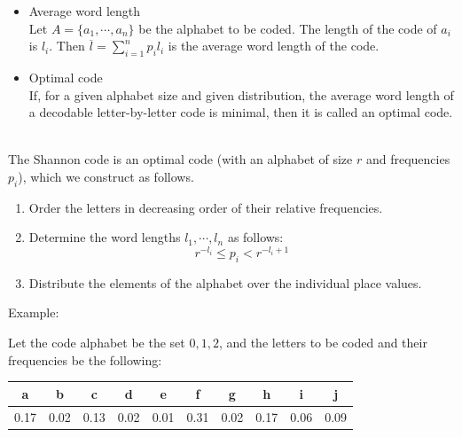 \documentclass[margin=0px]{article}
\begin{document}
\begin{description}
\begin{itemize}
                  \begin{enumerate}
                      \item decodable (uniquely decodable) if $\psi$ is injective
                      \item a prefix code if the range of $\varphi$ is prefix-free.
                      \item a uniform code (fixed length) if every element in the range of $\psi$ has the same length
                      \item a comma code if $\exists \vartheta \in B^+$ comma such that $\vartheta$ is a suffix of every code word, but is neither a prefix nor an infix of any code word.
                  \end{enumerate}
            \item Average word length \\
                  Let $A = \{a_1,\cdots, a_n\}$ be the alphabet to be coded. The length of the code of $a_i$ is $l_i$. Then $\overline{l} = \sum_{i=1}^{n}p_il_i$ is the average word length of the code.
            \item Optimal code \\
                  If, for a given alphabet size and given distribution, the average word length of a decodable letter-by-letter code is minimal, then it is called an optimal code.
        \end{itemize}
    \item[Shannon code] \hfill \\
        The Shannon code is an optimal code (with an alphabet of size $r$ and frequencies $p_i$), which we construct as follows.
        \begin{enumerate}
            \item Order the letters in decreasing order of their relative frequencies.
            \item Determine the word lengths $l_1,\cdots,l_n$ as follows:
                  \[r^{-l_i} \leq p_i < r^{-l_i+1} \]
            \item Distribute the elements of the alphabet over the individual place values.
        \end{enumerate}
        Example:

        Let the code alphabet be the set ${0,1,2}$, and the letters to be coded and their frequencies be the following:

        \begin{tabular}{|c|c|c|c|c|c|c|c|c|c|}
            \hline a    & b    & c    & d    & e    & f    & g    & h    & i    & j    \\
            \hline 0.17 & 0.02 & 0.13 & 0.02 & 0.01 & 0.31 & 0.02 & 0.17 & 0.06 & 0.09 \\
            \hline
        \end{tabular}


\end{description}
\end{document}
